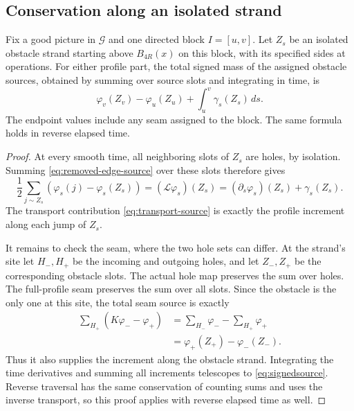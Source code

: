 \subsection{Conservation along an isolated strand}

\begin{lemma}\label{lem:signedsource}
Fix a good picture in $\mathcal G$ and one directed block $I=[u,v]$.
Let $Z_s$ be an isolated obstacle strand starting above $B_{4R}(x)$
on this block, with its specified sides at operations.  For either
profile part, the total signed mass of the assigned obstacle sources,
obtained by summing over source slots and integrating in time, is
\begin{equation}\label{eq:signedsource}
 \varphi_v(Z_v)-\varphi_u(Z_u)
                  +\int_u^v\gamma_s(Z_s)\,ds.
\end{equation}
The endpoint values include any seam assigned to the block.  The same
formula holds in reverse elapsed time.
\end{lemma}

\begin{proof}
At every smooth time, all neighboring slots of $Z_s$ are holes, by
isolation.  Summing \eqref{eq:removed-edge-source} over these slots
therefore gives
\[
 \frac12\sum_{j\sim Z_s}
             (\varphi_s(j)-\varphi_s(Z_s))
 = (\mathscr L\varphi_s)(Z_s)
 = (\partial_s\varphi_s)(Z_s)+\gamma_s(Z_s).
\]
The transport contribution \eqref{eq:transport-source} is exactly
the profile increment along each jump of $Z_s$.

It remains to check the seam, where the two hole sets can differ.
At the strand's site let $H_-,H_+$ be the incoming and outgoing holes,
and let $Z_-,Z_+$ be the corresponding obstacle slots.  The actual
hole map preserves the sum over holes.  The full-profile seam
preserves the sum over all slots.  Since the obstacle is the only
one at this site, the total seam source is exactly
\begin{align*}
 \sum_{H_+}(K\varphi_- -\varphi_+)
 &=\sum_{H_-}\varphi_- -\sum_{H_+}\varphi_+\\
 &=\varphi_+(Z_+)-\varphi_-(Z_-).
\end{align*}
Thus it also supplies the increment along the obstacle strand.
Integrating the time derivatives and summing all increments
telescopes to \eqref{eq:signedsource}.  Reverse traversal has the
same conservation of counting sums and uses the inverse transport,
so this proof applies with reverse elapsed time as well.
\end{proof}

